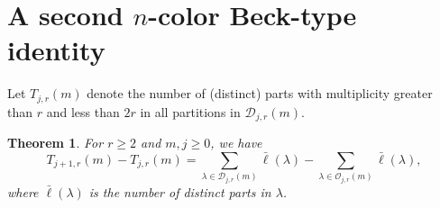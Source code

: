 \documentclass[reqno,12pt]{amsart}
\newtheorem{theorem}{Theorem}[section]
\theoremstyle{definition}
\begin{document}
\section{A second $n$-color Beck-type identity}

Let ${T}_{j,r}(m)$  denote the number of (distinct) parts with multiplicity greater than $r$ and less than $2r$ in all partitions in $\mathcal{D}_{j,r}(m)$.


\begin{theorem}\label{B2}
For $r\geq2$ and $m,j\geq0$, we have
\begin{equation}\label{eqnB2G}
{T}_{j+1,r}(m)-{T}_{j,r}(m)=\sum_{\lambda\in\mathcal{D}_{j,r}(m)}\bar{\ell}(\lambda)-\sum_{\lambda\in\mathcal{O}_{j,r}(m)}\bar{\ell}(\lambda),
\end{equation}
 where $\bar{\ell}(\lambda)$ is the number of distinct parts in $\lambda$.
\end{theorem}
\end{document}
